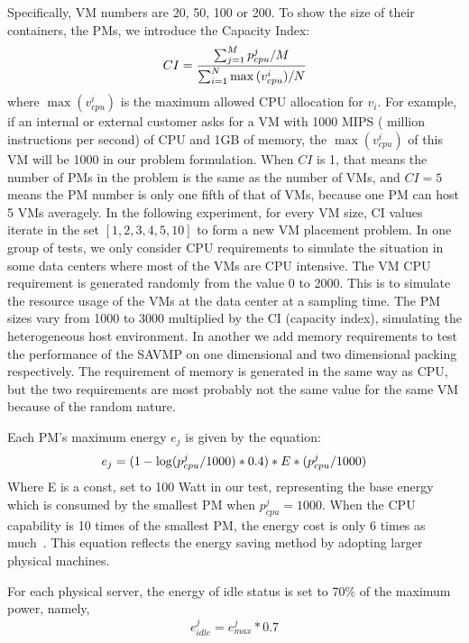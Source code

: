 \documentclass[10pt, conference, compsocconf]{IEEEtran}
\begin{document}
Specifically, VM numbers are 20, 50, 100 or 200. 
To show the size of their containers, the PMs, we introduce the Capacity
Index:
\begin{equation}\label{12}
CI=\frac{\sum_{j=1}^Mp_{cpu}^j / M}{\sum_{i=1}^N\max{(v_{cpu}^i)} / N} \\
\end{equation}
where $\max{(v_{cpu}^i)}$ is the maximum allowed CPU allocation for $v_i$. For
example, if an internal or external customer asks for a VM with 1000 MIPS (
million instructions per second) of CPU and 1GB of memory, the $\max{(v_{cpu}^i)}$ of
this VM will be 1000 in our problem formulation. When $CI$ is 1, that means the
number of PMs in the problem is the same as the number of VMs, and $CI=5$ means
the PM number is only one fifth of that of VMs, because one PM can host 5 VMs
averagely.
In the following experiment, for every VM size, CI values iterate in the set $
[1, 2, 3, 4, 5, 10]$ to form a new VM placement problem.
In one group of tests, we only consider CPU requirements to simulate the
situation in some data centers where most of the VMs are CPU intensive.
The VM CPU requirement is generated randomly from the value 0 to 2000. This is
to simulate the resource usage of the VMs at the data center at a sampling time.
The PM sizes vary from 1000 to 3000 multiplied by the CI (capacity index),
simulating the heterogeneous host environment. In another we add memory
requirements to test the performance of the SAVMP on one dimensional and two
dimensional packing respectively. The requirement of memory is generated in the
same way as CPU, but the two requirements are most probably not the same value
for the same VM because of the random nature.

Each PM's maximum energy $e_j$ is given by the equation:
\begin{equation}\label{13}
e_j=(1-\log (p_{cpu}^j/1000)*0.4)*E*(p_{cpu}^j/1000) \\
\end{equation}
Where E is a const, set to 100 Watt in our test, representing the base energy
which is consumed by the smallest PM when $p_{cpu}^j=1000$. When the CPU
capability is 10 times of the smallest PM, the energy cost is only 6 times as
much~\cite{Meikel08}. This equation reflects the energy saving method by
adopting larger physical machines.

For each physical server, the energy of idle status is set to 70\% of the
 maximum power, namely,
 \begin{equation}\label{14}
e_{idle}^j= e_{max}^j*0.7
\end{equation}
\end{document}
